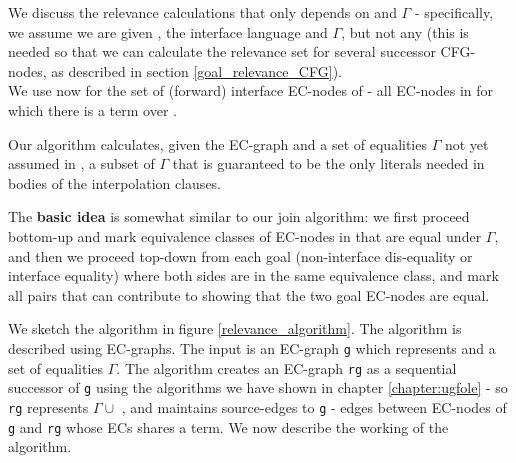 We discuss the relevance calculations that only depends on  and $\Gamma$ - specifically, we assume we are given , the interface language  and $\Gamma$, but not any  (this is needed so that we can calculate the relevance set for several successor CFG-nodes, as described in section \ref{goal_relevance_CFG}).\\
We use now 
 for the set of (forward) interface EC-nodes of  - all EC-nodes in  for which there is a term over .

Our algorithm calculates, given the EC-graph  and a set of equalities $\Gamma$ not yet assumed in , 
a subset of $\Gamma$ that is guaranteed to be the only literals needed in bodies of the interpolation clauses.

The \textbf{basic idea} is somewhat similar to our join algorithm: we first proceed bottom-up and mark equivalence classes of EC-nodes in  that are equal under $\Gamma$, and then we proceed top-down from each goal (non-interface dis-equality or interface equality) where both sides are in the same equivalence class, and mark all pairs that can contribute to showing that the two goal EC-nodes are equal.

We sketch the algorithm in figure \ref{relevance_algorithm}. The algorithm is described using EC-graphs. The input is an EC-graph 
\lstinline|g| which represents  and a set of equalities $\Gamma$.
The algorithm creates an EC-graph \lstinline|rg| as a sequential successor of \lstinline|g| using the algorithms we have shown in chapter \ref{chapter:ugfole} - so \lstinline|rg| represents $\Gamma \cup$ , and maintains source-edges to \lstinline|g| - edges between EC-nodes of \lstinline|g| and \lstinline|rg| whose ECs shares a term.
We now describe the working of the algorithm.

